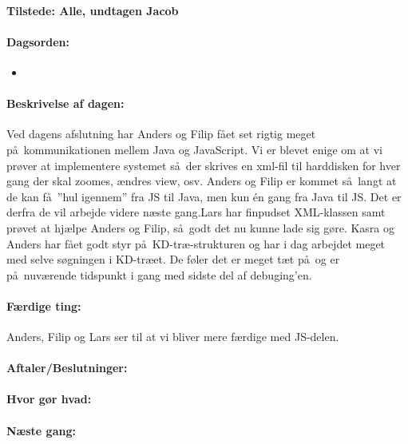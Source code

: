\documentclass[a4paper,10pt,titlepage]{article}
\begin{document}
		\paragraph{Tilstede: Alle, undtagen Jacob}
		\paragraph{Dagsorden:}
		\begin{itemize}
					\item 
					
		\end{itemize}
		
		\paragraph{Beskrivelse af dagen:}
		Ved dagens afslutning har Anders og Filip f\aa et set rigtig meget p\aa \ kommunikationen mellem Java og JavaScript. Vi er blevet enige om at vi pr\o ver at implementere systemet s\aa \ der skrives en xml-fil til harddisken for hver gang der skal zoomes, \ae ndres view, osv. Anders og Filip er kommet s\aa \ langt at de kan f\aa \ ”hul igennem” fra JS til Java, men kun én gang fra Java til JS. Det er derfra de vil arbejde videre n\ae ste gang.Lars har finpudset XML-klassen samt pr\o vet at hj\ae lpe Anders og Filip, s\aa \ godt det nu kunne lade sig g\o re.
Kasra og Anders har f\aa et godt styr p\aa \ KD-tr\ae -strukturen og har i dag arbejdet meget med selve s\o gningen i KD-tr\ae et. De f\o ler det er meget t\ae t p\aa \ og er p\aa \ nuv\ae rende tidspunkt i gang med sidste del af debuging’en.

		\paragraph{F\ae rdige ting:}
		Anders, Filip og Lars ser til at vi bliver mere f\ae rdige med JS-delen.
		\paragraph{Aftaler/Beslutninger:}
		
		\paragraph{Hvor g\o r hvad:}
		
		\paragraph{N\ae ste gang:}\mbox{}\\
		
\end{document}
